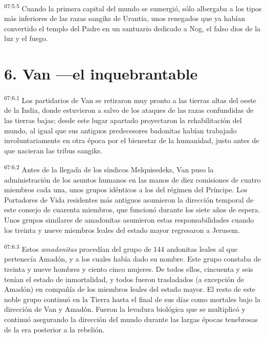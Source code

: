 \par
\textsuperscript{67:5.5} Cuando la primera capital del mundo se sumergió, sólo albergaba a los tipos más inferiores de las razas sangiks de Urantia, unos renegados que ya habían convertido el templo del Padre en un santuario dedicado a Nog, el falso dios de la luz y el fuego.

\section*{6. Van ---el inquebrantable}
\par
\textsuperscript{67:6.1} Los partidarios de Van se retiraron muy pronto a las tierras altas del oeste de la India, donde estuvieron a salvo de los ataques de las razas confundidas de las tierras bajas; desde este lugar apartado proyectaron la rehabilitación del mundo, al igual que sus antiguos predecesores badonitas habían trabajado involuntariamente en otra época por el bienestar de la humanidad, justo antes de que nacieran las tribus sangiks.

\par
\textsuperscript{67:6.2} Antes de la llegada de los síndicos Melquisedeks, Van puso la administración de los asuntos humanos en las manos de diez comisiones de cuatro miembros cada una, unos grupos idénticos a los del régimen del Príncipe. Los Portadores de Vida residentes más antiguos asumieron la dirección temporal de este consejo de cuarenta miembros, que funcionó durante los siete años de espera. Unos grupos similares de amadonitas asumieron estas responsabilidades cuando los treinta y nueve miembros leales del estado mayor regresaron a Jerusem.

\par
\textsuperscript{67:6.3} Estos \textit{amadonitas} procedían del grupo de 144 andonitas leales al que pertenecía Amadón, y a los cuales había dado su nombre. Este grupo constaba de treinta y nueve hombres y ciento cinco mujeres. De todos ellos, cincuenta y seis tenían el estado de inmortalidad, y todos fueron trasladados (a excepción de Amadón) en compañía de los miembros leales del estado mayor. El resto de este noble grupo continuó en la Tierra hasta el final de sus días como mortales bajo la dirección de Van y Amadón. Fueron la levadura biológica que se multiplicó y continuó asegurando la dirección del mundo durante las largas épocas tenebrosas de la era posterior a la rebelión.

